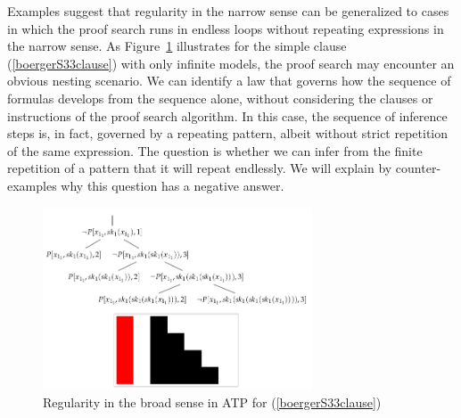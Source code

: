 \documentclass[%
  manuscript=article,   %
  year=2024,
  volume=77,
  doi=10.59203/zfn.77.694,
]{zfn}
\begin{document}
Examples suggest that regularity in the narrow sense can be generalized to cases in which the proof search runs in endless loops without repeating expressions in the narrow sense. As Figure~\ref{quine} illustrates for the simple clause (\ref{boergerS33clause}) with only infinite models, the proof search may encounter an obvious nesting scenario. We can identify a law that governs how the sequence of formulas develops from the sequence alone, without considering the clauses or instructions of the proof search algorithm. In this case, the sequence of inference steps is, in fact, governed by a repeating pattern, albeit without strict repetition of the same expression. The question is whether we can infer from the finite repetition of a pattern that it will repeat endlessly. We will explain by counter-examples why this question has a negative answer.

\begin{figure}[ht]
\begin{center}
\includegraphics[width=8cm]{ART_Lampert/fig2.png}
\end{center}
\caption{Regularity in the broad sense in ATP for (\ref{boergerS33clause})}
    \label{quine}
\end{figure}
\end{document}
